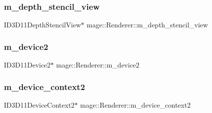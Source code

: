 \hypertarget{classmage_1_1_renderer_a85b04ce9e3d0086c499910b2df82876d}{}\label{classmage_1_1_renderer_a85b04ce9e3d0086c499910b2df82876d} 
\subsubsection{\texorpdfstring{m\+\_\+depth\+\_\+stencil\+\_\+view}{m\_depth\_stencil\_view}}
{\footnotesize\ttfamily I\+D3\+D11\+Depth\+Stencil\+View$\ast$ mage\+::\+Renderer\+::m\+\_\+depth\+\_\+stencil\+\_\+view\hspace{0.3cm}{\ttfamily [protected]}}

\hypertarget{classmage_1_1_renderer_a5af9d44e53bd523136cc52855a2dbe25}{}\label{classmage_1_1_renderer_a5af9d44e53bd523136cc52855a2dbe25} 
\subsubsection{\texorpdfstring{m\+\_\+device2}{m\_device2}}
{\footnotesize\ttfamily I\+D3\+D11\+Device2$\ast$ mage\+::\+Renderer\+::m\+\_\+device2\hspace{0.3cm}{\ttfamily [protected]}}

\hypertarget{classmage_1_1_renderer_a57bee762f1a8c0ca13c62874a4297f48}{}\label{classmage_1_1_renderer_a57bee762f1a8c0ca13c62874a4297f48} 
\subsubsection{\texorpdfstring{m\+\_\+device\+\_\+context2}{m\_device\_context2}}
{\footnotesize\ttfamily I\+D3\+D11\+Device\+Context2$\ast$ mage\+::\+Renderer\+::m\+\_\+device\+\_\+context2\hspace{0.3cm}{\ttfamily [protected]}}

\hypertarget{classmage_1_1_renderer_ae7ff3dd640a2319d1d263bd9ba657076}{}\label{classmage_1_1_renderer_ae7ff3dd640a2319d1d263bd9ba657076} 
